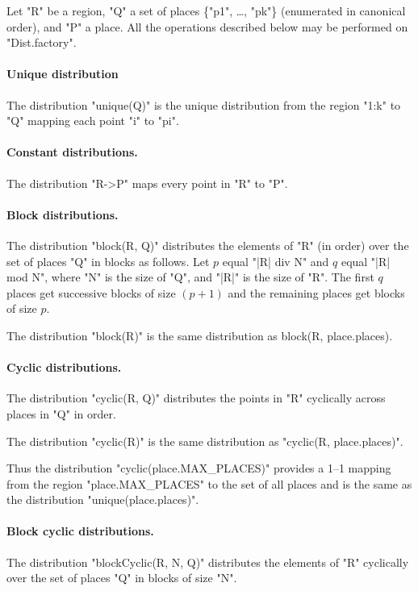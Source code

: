 Let \xcd"R" be a region, \xcd"Q" a set of places \{\xcd"p1", \dots, \xcd"pk"\}
(enumerated in canonical order), and \xcd"P" a place. All the operations
described below may be performed on \xcd"Dist.factory".

\paragraph{Unique distribution} 
The distribution \xcd"unique(Q)" is the unique distribution from the
region \xcd"1:k" to \xcd"Q" mapping each point \xcd"i" to \xcd"pi".

\paragraph{Constant distributions.} 
The distribution \xcd"R->P" maps every point in \xcd"R" to \xcd"P".

\paragraph{Block distributions.}
The distribution \xcd"block(R, Q)" distributes the elements of \xcd"R"
(in order) over the set of places \xcd"Q" in blocks  as
follows. Let $p$ equal \xcd"|R| div N" and $q$ equal \xcd"|R| mod N",
where \xcd"N" is the size of \xcd"Q", and 
\xcd"|R|" is the size of \xcd"R".  The first $q$ places get
successive blocks of size $(p+1)$ and the remaining places get blocks of
size $p$.

The distribution \xcd"block(R)" is the same distribution as {\cf
block(R, place.places)}.

\paragraph{Cyclic distributions.} 
The distribution \xcd"cyclic(R, Q)" distributes the points in \xcd"R"
cyclically across places in \xcd"Q" in order.

The distribution \xcd"cyclic(R)" is the same distribution as \xcd"cyclic(R, place.places)".

Thus the distribution \xcd"cyclic(place.MAX_PLACES)" provides a 1--1
mapping from the region \xcd"place.MAX_PLACES" to the set of all
places and is the same as the distribution \xcd"unique(place.places)".

\paragraph{Block cyclic distributions.}
The distribution \xcd"blockCyclic(R, N, Q)" distributes the elements
of \xcd"R" cyclically over the set of places \xcd"Q" in blocks of size
\xcd"N".

